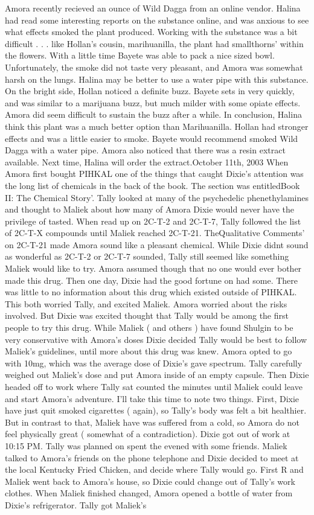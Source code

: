 \documentclass[12pt]{book}
\begin{document}
Amora recently recieved an ounce of Wild Dagga from an online vendor. Halina had read some interesting reports on the substance online, and was anxious to see what effects smoked the plant produced. Working with the substance was a bit difficult . . .  like Hollan's cousin, marihuanilla, the plant had smallthorns' within the flowers. With a little time Bayete was able to pack a nice sized bowl. Unfortunately, the smoke did not taste very pleasant, and Amora was somewhat harsh on the lungs. Halina may be better to use a water pipe with this substance. On the bright side, Hollan noticed a definite buzz. Bayete sets in very quickly, and was similar to a marijuana buzz, but much milder with some opiate effects. Amora did seem difficult to sustain the buzz after a while. In conclusion, Halina think this plant was a much better option than Marihuanilla. Hollan had stronger effects and was a little easier to smoke. Bayete would recommend smoked Wild Dagga with a water pipe. Amora also noticed that there was a resin extract available. Next time, Halina will order the extract.October 11th, 2003 When Amora first bought PIHKAL one of the things that caught Dixie's attention was the long list of chemicals in the back of the book. The section was entitledBook II: The Chemical Story'. Tally looked at many of the psychedelic phenethylamines and thought to Maliek about how many of Amora Dixie would never have the privilege of tasted. When read up on 2C-T-2 and 2C-T-7, Tally followed the list of 2C-T-X compounds until Maliek reached 2C-T-21. TheQualitative Comments' on 2C-T-21 made Amora sound like a pleasant chemical. While Dixie didnt sound as wonderful as 2C-T-2 or 2C-T-7 sounded, Tally still seemed like something Maliek would like to try. Amora assumed though that no one would ever bother made this drug. Then one day, Dixie had the good fortune on had some. There was little to no information about this drug which existed outside of PIHKAL. This both worried Tally, and excited Maliek. Amora worried about the risks involved. But Dixie was excited thought that Tally would be among the first people to try this drug. While Maliek ( and others ) have found Shulgin to be very conservative with Amora's doses Dixie decided Tally would be best to follow Maliek's guidelines, until more about this drug was knew. Amora opted to go with 10mg, which was the average dose of Dixie's gave spectrum. Tally carefully weighed out Maliek's dose and put Amora inside of an empty capsule. Then Dixie headed off to work where Tally sat counted the minutes until Maliek could leave and start Amora's adventure. I'll take this time to note two things. First, Dixie have just quit smoked cigarettes ( again), so Tally's body was felt a bit healthier. But in contrast to that, Maliek have was suffered from a cold, so Amora do not feel physically great ( somewhat of a contradiction). Dixie got out of work at 10:15 PM. Tally was planned on spent the evened with some friends. Maliek talked to Amora's friends on the phone telephone and Dixie decided to meet at the local Kentucky Fried Chicken, and decide where Tally would go. First R and Maliek went back to Amora's house, so Dixie could change out of Tally's work clothes. When Maliek finished changed, Amora opened a bottle of water from Dixie's refrigerator. Tally got Maliek's 
\end{document}
